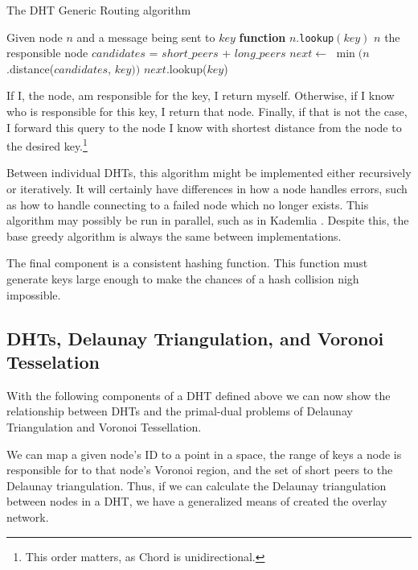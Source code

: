 \documentclass[11pt,conference]{IEEEtran}
\begin{document}
\begin{algorithm}
	\caption{The DHT Generic Routing algorithm}
	\label{alg:routing}
	\begin{algorithmic}[1]
		\STATE Given node $n$ and a message being sent to $key$
		\STATE \textbf{function} $n.$\texttt{lookup}$(key)$
			\RETURN $ n $
		\ENDIF
			\RETURN the responsible node
		\ENDIF
		\STATE $ candidates $ = $ short\_peers $ + $ long\_peers $
		\STATE $ next  \leftarrow $  $\min (n$.distance($candidates$, $ key ))$
		\RETURN $next.$lookup($key$)
	\end{algorithmic}
	
	\scriptsize
\end{algorithm}
If I, the node, am responsible for the key, I return myself.
Otherwise, if I know who is responsible for this key, I return that node.
Finally, if that is not the case, I forward this query to the node I know with shortest distance from the node to the desired key.\footnote{This order matters, as Chord is unidirectional.} 

Between individual DHTs, this algorithm might be implemented either recursively or iteratively.
It will certainly have differences in how a node handles errors, such as how to handle connecting to a failed node which no longer exists.
This algorithm may possibly be  run in parallel, such as in Kademlia \cite{kademlia}.
Despite this, the base greedy algorithm is always the same between implementations.

The final component is a consistent hashing function.
This function must generate keys large enough to make the chances of a hash collision nigh impossible.

\subsection{DHTs, Delaunay Triangulation, and Voronoi Tesselation}
With the following components of a DHT defined above we can now show the relationship between DHTs and the primal-dual problems of Delaunay Triangulation and Voronoi Tessellation.


We can map a given node's ID to a point in a space, the range of keys a node is responsible for to that node's Voronoi region, and the set of short peers to the Delaunay triangulation.
Thus, if we can calculate the Delaunay triangulation between nodes in a DHT, we have a generalized means of created the overlay network.
\end{document}
